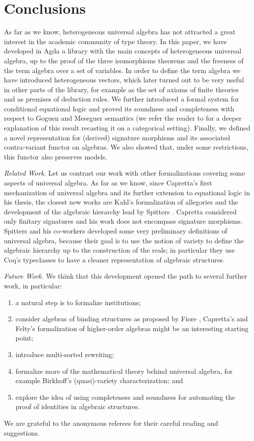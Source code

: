 \section{Conclusions}
\label{sec:conclusions}

As far as we know, heterogeneous universal algebra has not attracted a
great interest in the academic community of type theory. In this
paper, we have developed in Agda a library with the main concepts of
heterogeneous universal algebra, up to the proof of the three
isomorphisms theorems and the freeness of the term algebra over a set
of variables. In order to define the term algebra we have introduced
heterogeneous vectors, which later turned out to be very useful in
other parts of the library, for example as the set of axioms of finite
theories and as premises of deduction rules. We further introduced a
formal system for conditional equational logic and proved its
soundness and completeness with respect to Goguen and Meseguer
semantics (we refer the reader to \cite{vidal-06} for a deeper
explanation of this result recasting it on a categorical
setting). Finally, we defined a novel representation for (derived)
signature morphisms and its associated contra-variant functor on
algebras. We also showed that, under some restrictions, this functor
also preserves models.

\textit{Related Work.} Let us contrast our work with other
formalizations covering some aspects of universal algebra. As far as
we know, since Capretta's \cite{capretta-99} first mechanization of
universal algebra and its further extension to equational logic in his
thesis, the closest new works are Kahl's \cite{kahl-2011}
formalization of allegories and the development of the algebraic
hierarchy lead by Spitters \cite{spitters-algebraic-11}. Capretta
considered only finitary signatures and his work does not encompass
signature morphisms. Spitters and his co-workers developed some very
preliminary definitions of universal algebra, because their goal is to
use the notion of variety to define the algebraic hierarchy up to the
construction of the reals; in particular they use Coq's typeclasses to
have a cleaner representation of algebraic structures.


\textit{Future Work.} We think that this development opened the path
to several further work, in particular:
\begin{enumerate}
\item a natural step is to formalize institutions;
\item consider algebras of binding structures as proposed by Fiore
\cite{fiore-2010}, Capretta's and Felty's formalization \cite{capretta/felty:2009}
of higher-order algebras might be an interesting starting point;
\item introduce multi-sorted rewriting;
\item formalize more of the mathematical theory behind universal algebra, for
  example Birkhoff's (quasi)-variety characterization; and
\item explore the idea of using completeness and soundness for
  automating the proof of identities in algebraic structures. %
\end{enumerate}

  We are grateful to the anonymous referees for their careful reading
  and suggestions.

